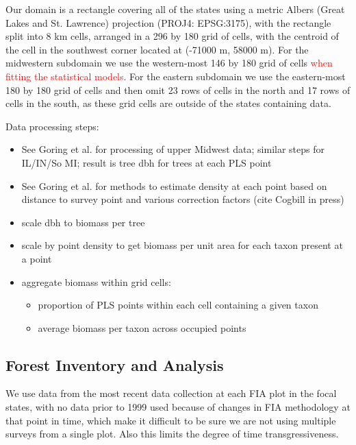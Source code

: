 \documentclass[12pt]{article}\usepackage[]{graphicx}\usepackage[]{color}
\begin{document}
Our domain is a rectangle covering all of the states using a metric
Albers (Great Lakes and St. Lawrence) projection (PROJ4: EPSG:3175),
with the rectangle split into 8 km cells, arranged in a 296 by 180
grid of cells, with the centroid of the cell in the southwest corner
located at (-71000 m, 58000 m). For the midwestern subdomain we use
the western-most 146 by 180 grid of cells\textcolor{red}{{} when fitting
the statistical models}. For the eastern subdomain we use the eastern-most
180 by 180 grid of cells and then omit 23 rows of cells in the north
and 17 rows of cells in the south, as these grid cells are outside
of the states containing data.

Data processing steps:
\begin{itemize}
\item See Goring et al. for processing of upper Midwest data; similar steps
for IL/IN/So MI; result is tree dbh for trees at each PLS point
\item See Goring et al. for methods to estimate density at each point based
on distance to survey point and various correction factors (cite Cogbill
in press)
\item scale dbh to biomass per tree
\item scale by point density to get biomass per unit area for each taxon
present at a point
\item aggregate biomass within grid cells:

\begin{itemize}
\item proportion of PLS points within each cell containing a given taxon
\item average biomass per taxon across occupied points
\end{itemize}
\end{itemize}

\subsection{Forest Inventory and Analysis}

We use data from the most recent data collection at each FIA plot
in the focal states, with no data prior to 1999 used because of changes
in FIA methodology at that point in time, which make it difficult
to be sure we are not using multiple surveys from a single plot. Also
this limits the degree of time transgressiveness. 
\end{document}
